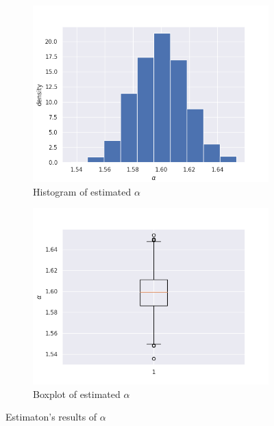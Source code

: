 \documentclass{article}
\begin{document}
	\begin{figure}
		\centering
		\begin{subfigure}[H]{0.49\textwidth}
			\centering
			\includegraphics[width=1\linewidth]{images/cf_alpha_estimation_hist}
			\caption{Histogram of estimated $\alpha$}\label{9}
		\end{subfigure}
		\hfill
		\begin{subfigure}[H]{0.49\textwidth}
			\centering
			\includegraphics[width=1\linewidth]{images/cf_alpha_estimation_boxplot}
			\caption{Boxplot of estimated $\alpha$}\label{10}
		\end{subfigure}\caption{Estimaton's results of $\alpha$}
	\end{figure}
\end{document}
